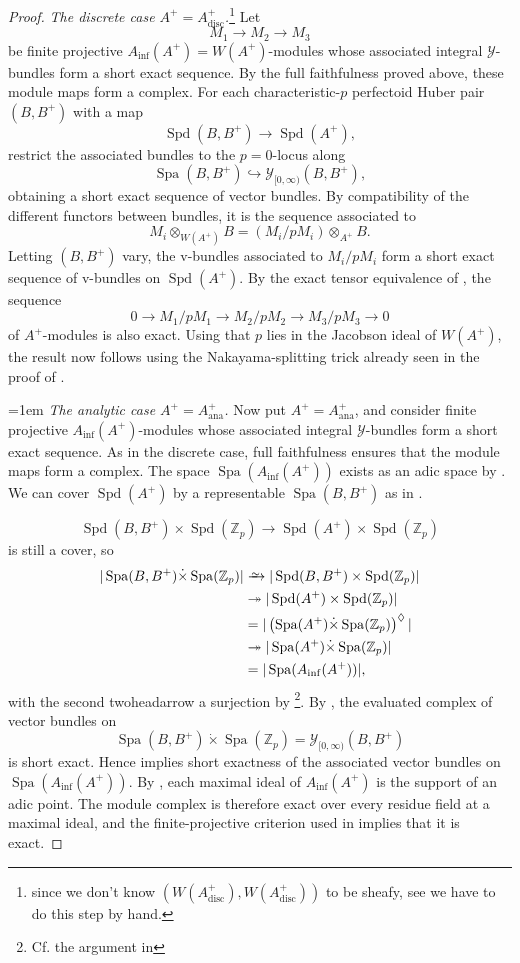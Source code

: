 \documentclass[10pt,twoside]{article}
\numberwithin{equation}{section}
\newcommand\isom{
	\xrightarrow{\smash{\raisebox{-0.65ex}{\ensuremath{\scriptstyle\sim}}}}
}
\theoremstyle{plain}
\theoremstyle{definition}
\DeclareMathOperator{\Spa}{Spa}
\DeclareMathOperator{\Spd}{Spd}
\DeclareMathOperator{\ana}{ana}
\DeclareMathOperator{\disc}{disc}
\newcommand{\ZZ}{\mathbb{Z}}
\newcommand{\MCY}{\mathcal{Y}}
\let \diamond \Diamond
\DeclareMathOperator{\Inf}{inf}
\newcommand{\Ainf}{A_{\Inf}}
\newcommand{\Yco}{\MCY_{[0,\infty)}}
\begin{document}
\begin{proof}
\emph{The discrete case \(A^+=A^+_{\disc}\).}\footnote{since we don't know \((W(A^+_{\disc}),W(A^+_{\disc}))\) to be sheafy, see  we have to do this step by hand.} Let 
\[ M_1\longrightarrow M_2\longrightarrow M_3\]
 be finite projective \(\Ainf(A^+)=W(A^+)\)-modules whose associated integral \(\MCY\)-bundles form a short exact sequence. By the full faithfulness proved above, these module maps form a complex. For each characteristic-\(p\) perfectoid Huber pair \((B,B^+)\) with a map
\[\Spd(B,B^+)\longrightarrow \Spd(A^+),\]
restrict the associated bundles to the \(p=0\)-locus along
\[\Spa(B,B^+)\hookrightarrow\Yco(B,B^+),\]
obtaining a short exact sequence of vector bundles. By compatibility of the different functors between bundles, it is the sequence associated to
\[M_i\otimes_{W(A^+)}B=(M_i/pM_i)\otimes_{A^+} B.\]
Letting \((B,B^+)\) vary, the v-bundles associated to \(M_i/pM_i\) form a short exact sequence of v-bundles on \(\Spd(A^+)\). By the exact tensor equivalence of \cite[Corollary 5.3]{Kim}, the sequence
\[0\longrightarrow M_1/pM_1\longrightarrow M_2/pM_2\longrightarrow M_3/pM_3\longrightarrow0\]
of \(A^+\)-modules is also exact. Using that \(p\) lies in the Jacobson ideal of \(W(A^+)\), the result now follows using the Nakayama-splitting trick already seen in the proof of .\par
{\emergencystretch=1em \emph{The analytic case \(A^+=A^+_{\ana}\).} Now put \(A^+=A^+_{\ana}\), and consider finite projective \(\Ainf(A^+)\)-modules whose associated integral \(\MCY\)-bundles form a short exact sequence. As in the discrete case, full faithfulness ensures that the module maps form a complex. The space \(\Spa(\Ainf(A^+))\) exists as an adic space by . We can cover \(\Spd(A^+)\) by a representable \(\Spa(B,B^+)\) as in .\par}
\[\Spd(B,B^+)\times \Spd(\ZZ_p)\longrightarrow \Spd(A^+)\times \Spd(\ZZ_p)\]
is still a cover, so 
\begin{align*}
    |\Spa(B,B^+)\dot\times \Spa(\ZZ_p)|&\isom|\Spd(B,B^+)\times\Spd(\ZZ_p)|\\
    &\twoheadrightarrow |\Spd(A^+)\times \Spd(\ZZ_p)|\\
    &= |\left(\Spa(A^+)\dot\times \Spa(\ZZ_p)\right)^{\diamond}|\\
    &\twoheadrightarrow |\Spa(A^+)\dot\times \Spa(\ZZ_p)|\\
    &=|\Spa(\Ainf(A^+))|,
\end{align*}
with the second twoheadarrow a surjection by \cite[Proposition 18.2.2]{SW20}\footnote{Cf. the argument in }. By , the evaluated complex of vector bundles on
\[\Spa(B,B^+)\dot\times \Spa(\ZZ_p)=\Yco(B,B^+)\]
is short exact. Hence  implies short exactness of the associated vector bundles on \(\Spa(\Ainf(A^+))\). By , each maximal ideal of \(\Ainf(A^+)\) is the support of an adic point. The module complex is therefore exact over every residue field at a maximal ideal, and the finite-projective criterion used in  implies that it is exact.
\end{proof}
\end{document}
